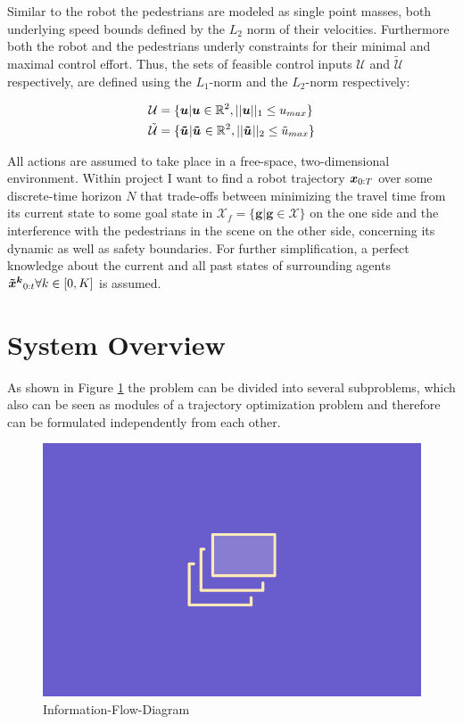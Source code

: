Similar to the robot the pedestrians are modeled as single point masses, both underlying speed bounds defined by the $L_2$ norm of their velocities. Furthermore both the robot and the pedestrians underly constraints for their minimal and maximal control effort. Thus, the sets of feasible control inputs $
\mathcal{U}$ and $\mathcal{\tilde{U}}$ respectively, are defined using the $L_1$-norm and the $L_2$-norm respectively:

\begin{align}
\mathcal{U} &= \{\u | \u \in \mathbb{R}^2, ||\u||_1 \leq u_{max}\} \\
\mathcal{\tilde{U}} &= \{\uped[] | \uped[] \in \mathbb{R}^2, ||\uped[]||_2 \leq \tilde{u}_{max}\} 
\label{eq:controls_bounds}
\end{align}
 
All actions are assumed to take place in a free-space, two-dimensional environment. 
\newline
Within project \project I want to find a robot trajectory $\boldsymbol{x}_{0:T}$ over some discrete-time horizon $N$ that trade-offs between minimizing the travel time from its current state to some goal state in $\mathcal{X}_f = \{\boldsymbol{g} | \boldsymbol{g} \in \mathcal{X} \}$ on the one side and the interference with the pedestrians in the scene on the other side, concerning its dynamic as well as safety boundaries. For further simplification, a perfect knowledge about the current and all past states of surrounding agents $\xped[k]_{0:t} \forall k \in [0, K]$ is assumed. 

\section{System Overview}
\label{text:approach/overview}
As shown in Figure \ref{img:information_flow} the problem can be divided into several subproblems, which also can be seen as modules of a trajectory optimization problem and therefore can be formulated independently from each other. 

\begin{figure}[!ht]
\begin{center}
\includegraphics[width=\imgwidth]{images/placeholder.png}
\caption{Information-Flow-Diagram}
\label{img:information_flow}
\end{center}
\end{figure}

